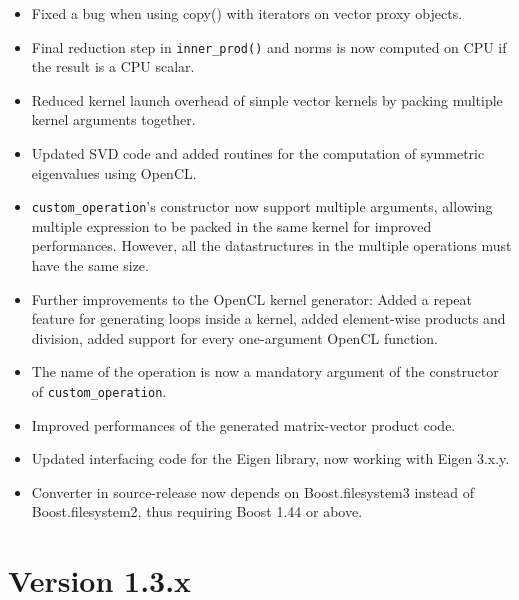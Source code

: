 \begin{itemize}
 \item Fixed a bug when using copy() with iterators on vector proxy objects.
 \item Final reduction step in \lstinline|inner_prod()| and norms is now computed on CPU if the result is a CPU scalar.
 \item Reduced kernel launch overhead of simple vector kernels by packing multiple kernel arguments together.
 \item Updated SVD code and added routines for the computation of symmetric eigenvalues using OpenCL.
 \item \lstinline|custom_operation|'s constructor now support multiple arguments, allowing multiple expression to be packed in the same kernel for improved performances. However, all the datastructures in the multiple operations must have the same size.
 \item Further improvements to the OpenCL kernel generator: Added a repeat feature for generating loops inside a kernel,
       added element-wise products and division, added support for every one-argument OpenCL function.
 \item The name of the operation is now a mandatory argument of the constructor of \lstinline|custom_operation|.
 \item Improved performances of the generated matrix-vector product code.
 \item Updated interfacing code for the Eigen library, now working with Eigen 3.x.y.
 \item Converter in source-release now depends on Boost.filesystem3 instead of Boost.filesystem2, thus requiring Boost 1.44 or above.
\end{itemize}





\section*{Version 1.3.x}

